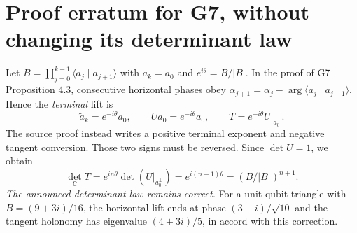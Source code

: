 \documentclass[11pt]{article}
\begin{document}
\section{Proof erratum for G7, without changing its determinant law}
Let $B=\prod_{j=0}^{k-1}\langle a_j\mid a_{j+1}\rangle$ with $a_k=a_0$ and $e^{i\theta}=B/|B|$. In the proof of G7 Proposition 4.3, consecutive horizontal phases obey
\(\alpha_{j+1}=\alpha_j-\arg\langle a_j\mid a_{j+1}\rangle.\)
Hence the \emph{terminal} lift is
\begin{equation}
\widetilde a_k=e^{-i\theta}a_0, \qquad U a_0=e^{-i\theta}a_0, \qquad T=e^{+i\theta}U\vert_{a_0^\perp}.
\end{equation}
The source proof instead writes a positive terminal exponent and negative tangent conversion. Those two signs must be reversed. Since $\det U=1$, we obtain
\begin{equation}
\det_{\mathbb C}T=e^{in\theta}\det(U\vert_{a_0^\perp})=e^{i(n+1)\theta}=(B/|B|)^{n+1}.
\end{equation}
\emph{The announced determinant law remains correct.} For a unit qubit triangle with $B=(9+3i)/16$, the horizontal lift ends at phase $(3-i)/\sqrt{10}$ and the tangent holonomy has eigenvalue $(4+3i)/5$, in accord with this correction.
\end{document}
